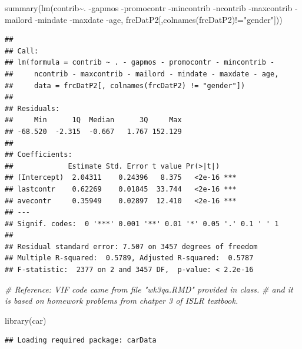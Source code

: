 \documentclass[
]{article}
\newenvironment{Shaded}{\begin{snugshade}}{\end{snugshade}}
\newcommand{\CommentTok}[1]{\textcolor[rgb]{0.56,0.35,0.01}{\textit{#1}}}
\newcommand{\FunctionTok}[1]{\textcolor[rgb]{0.00,0.00,0.00}{#1}}
\newcommand{\NormalTok}[1]{#1}
\newcommand{\SpecialCharTok}[1]{\textcolor[rgb]{0.00,0.00,0.00}{#1}}
\newcommand{\StringTok}[1]{\textcolor[rgb]{0.31,0.60,0.02}{#1}}
\begin{document}
\begin{Shaded}
\begin{Highlighting}[]
\FunctionTok{summary}\NormalTok{(}\FunctionTok{lm}\NormalTok{(contrib}\SpecialCharTok{\textasciitilde{}}\NormalTok{.}
           \SpecialCharTok{{-}}\NormalTok{gapmos}
           \SpecialCharTok{{-}}\NormalTok{promocontr}
           \SpecialCharTok{{-}}\NormalTok{mincontrib}
           \SpecialCharTok{{-}}\NormalTok{ncontrib}
           \SpecialCharTok{{-}}\NormalTok{maxcontrib}
           \SpecialCharTok{{-}}\NormalTok{mailord}
           \SpecialCharTok{{-}}\NormalTok{mindate}
           \SpecialCharTok{{-}}\NormalTok{maxdate}
           \SpecialCharTok{{-}}\NormalTok{age,}
\NormalTok{           frcDatP2[,}\FunctionTok{colnames}\NormalTok{(frcDatP2)}\SpecialCharTok{!=}\StringTok{"gender"}\NormalTok{]))}
\end{Highlighting}
\end{Shaded}

\begin{verbatim}
## 
## Call:
## lm(formula = contrib ~ . - gapmos - promocontr - mincontrib - 
##     ncontrib - maxcontrib - mailord - mindate - maxdate - age, 
##     data = frcDatP2[, colnames(frcDatP2) != "gender"])
## 
## Residuals:
##     Min      1Q  Median      3Q     Max 
## -68.520  -2.315  -0.667   1.767 152.129 
## 
## Coefficients:
##             Estimate Std. Error t value Pr(>|t|)    
## (Intercept)  2.04311    0.24396   8.375   <2e-16 ***
## lastcontr    0.62269    0.01845  33.744   <2e-16 ***
## avecontr     0.35949    0.02897  12.410   <2e-16 ***
## ---
## Signif. codes:  0 '***' 0.001 '**' 0.01 '*' 0.05 '.' 0.1 ' ' 1
## 
## Residual standard error: 7.507 on 3457 degrees of freedom
## Multiple R-squared:  0.5789, Adjusted R-squared:  0.5787 
## F-statistic:  2377 on 2 and 3457 DF,  p-value: < 2.2e-16
\end{verbatim}

\begin{Shaded}
\begin{Highlighting}[]
\CommentTok{\# Reference: VIF code came from file "wk3qa.RMD" provided in class.}
\CommentTok{\# and it is based on homework problems from chatper 3 of ISLR textbook.}

\FunctionTok{library}\NormalTok{(car)}
\end{Highlighting}
\end{Shaded}

\begin{verbatim}
## Loading required package: carData
\end{verbatim}
\end{document}
